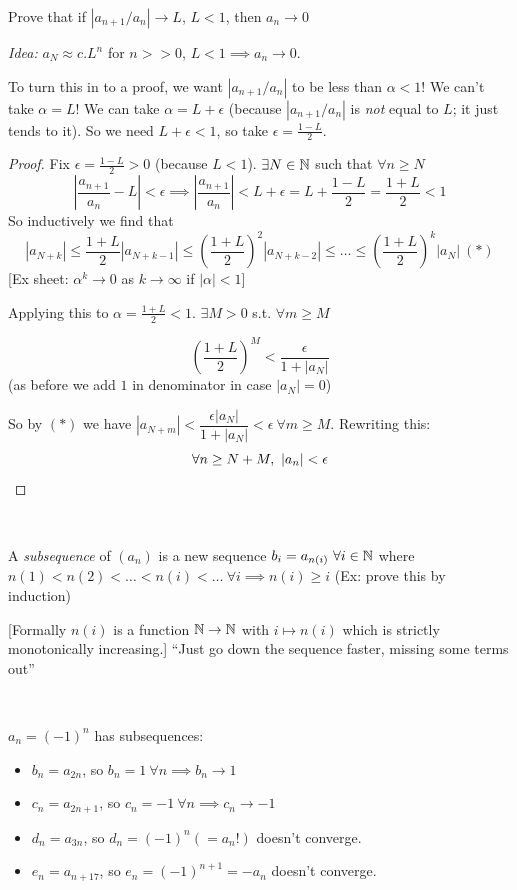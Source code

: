 \documentclass[twoside]{scrartcl}
\begin{document}
\begin{example}
Prove that if $\left|a_{n+1}/a_n\right|\to L$, $L < 1$, then $a_n \to 0$	

\emph{Idea:} $a_N \approx c.L^n$ for $n >> 0$, $L<1 \implies a_n \to 0$. 

To turn this in to a proof, we want $\left|a_{n+1}/a_n\right|$ to be less than $\alpha <1$! We can't take $\alpha = L$! We can take $\alpha = L + \epsilon$ (because $\left|a_{n+1}/a_n\right|$ is \emph{not} equal to $L$; it just tends to it). So we need $L + \epsilon < 1$, so take $\epsilon = \frac{1-L}{2}$.

\begin{proof}
Fix $\epsilon = \frac{1-L}{2} > 0$ (because $L < 1$). $\exists N \in\mathbb{N}$ such that $\forall n \geq N$
\[\left|\frac{a_{n+1}}{a_n} - L\right| < \epsilon \implies \left|\frac{a_{n+1}}{a_n}\right| < L + \epsilon = L + \frac{1-L}{2} = \frac{1+L}{2} < 1\]
So inductively we find that
\[|a_{N+k}| \leq \frac{1+L}{2} |a_{N+k-1}| \leq \left(\frac{1+L}{2}\right)^2 |a_{N+k-2}| \leq \dots \leq \left(\frac{1+L}{2}\right)^k |a_{N}| ~(*)\]
[Ex sheet: $\alpha^k \to 0$ as $k \to \infty$ if $|\alpha| < 1$]

Applying this to $\alpha = \frac{1+L}{2} < 1$. $\exists M > 0$ s.t. $\forall m \geq M$

\[\left(\frac{1+L}{2}\right)^M < \frac{\epsilon}{1 + |a_N|}\]
(as before we add $1$ in denominator in case $|a_N| = 0$)

So by $(*)$ we have $|a_{N+m}| < \dfrac{\epsilon|a_N|}{1 + |a_N|} < \epsilon~\forall m \geq M$. Rewriting this: 
\[\forall n \geq N+M,~ |a_n| < \epsilon\qedhere\]
\end{proof}
\end{example}~


\begin{definition}
A \emph{subsequence} of $(a_n)$ is a new sequence $b_i = a_{n(i)}~ \forall i \in\mathbb{N}$ where $n(1) < n(2) < \dots < n(i) < \dots ~\forall i \implies n(i) \geq i$ (Ex: prove this by induction)

[Formally $n(i)$ is a function $\mathbb{N} \to \mathbb{N}$ with $i \mapsto n(i)$ which is strictly monotonically increasing.] ``Just go down the sequence faster, missing some terms out''
\end{definition}~

\begin{example}
$a_n = (-1)^n$ has subsequences:
\begin{itemize}
	\item $b_n = a_{2n}$, so $b_n = 1~\forall n \implies b_n \to 1$
	\item $c_n = a_{2n+1}$, so $c_n = -1~\forall n \implies c_n \to -1$
	\item $d_n = a_{3n}$, so $d_n = (-1)^n (=a_n!)$ doesn't converge. 
	\item $e_n = a_{n+17}$, so $e_n = (-1)^{n+1} = -a_n$ doesn't converge.
\end{itemize}

\end{example}
\end{document}
